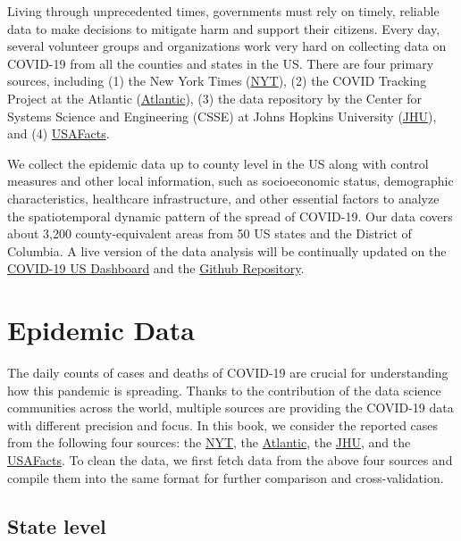 \documentclass[]{book}
\begin{document}
Living through unprecedented times, governments must rely on timely,
reliable data to make decisions to mitigate harm and support their
citizens. Every day, several volunteer groups and organizations work
very hard on collecting data on COVID-19 from all the counties and
states in the US. There are four primary sources, including (1) the New
York Times (\href{https://github.com/nytimes/covid-19-data}{NYT}), (2)
the COVID Tracking Project at the Atlantic
(\href{https://covidtracking.com}{Atlantic}), (3) the data repository by
the Center for Systems Science and Engineering (CSSE) at Johns Hopkins
University (\href{https://github.com/CSSEGISandData/COVID-19}{JHU}), and
(4)
\href{https://usafacts.org/visualizations/coronavirus-covid-19-spread-map}{USAFacts}.

We collect the epidemic data up to county level in the US along with
control measures and other local information, such as socioeconomic
status, demographic characteristics, healthcare infrastructure, and
other essential factors to analyze the spatiotemporal dynamic pattern of
the spread of COVID-19. Our data covers about 3,200 county-equivalent
areas from 50 US states and the District of Columbia. A live version of
the data analysis will be continually updated on the
\href{https://covid19.stat.iastate.edu}{COVID-19 US Dashboard} and the
\href{https://github.com/covid19-dashboard-us/cdcar}{Github Repository}.

\section{Epidemic Data}\label{epidemic-data}

The daily counts of cases and deaths of COVID-19 are crucial for
understanding how this pandemic is spreading. Thanks to the contribution
of the data science communities across the world, multiple sources are
providing the COVID-19 data with different precision and focus. In this
book, we consider the reported cases from the following four sources:
the \href{https://github.com/nytimes/covid-19-data}{NYT}, the
\href{https://covidtracking.com}{Atlantic}, the
\href{https://github.com/CSSEGISandData/COVID-19}{JHU}, and the
\href{https://usafacts.org/visualizations/coronavirus-covid-19-spread-map}{USAFacts}.
To clean the data, we first fetch data from the above four sources and
compile them into the same format for further comparison and
cross-validation.

\subsection{State level}\label{state-level}
\end{document}
